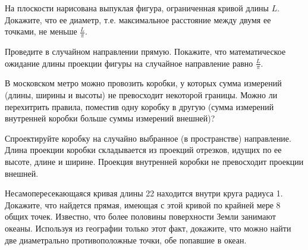 \begin{problem}
На плоскости нарисована выпуклая фигура, ограниченная кривой длины $L$. Докажите, что ее диаметр, т.е. максимальное расстояние между двумя ее точками, не меньше $\frac{L}{\pi }$.
\end{problem}
\begin{ordre}
Проведите в случайном направлении прямую. Покажите, что 
математическое ожидание длины проекции фигуры на случайное направление равно 
$\frac{L}{\pi }$.
\end{ordre}

\begin{problem}
В московском метро можно провозить коробки, у которых сумма измерений (длины, ширины и высоты) не превосходит некоторой границы. Можно ли перехитрить правила, поместив одну коробку в другую (сумма измерений внутренней коробки больше суммы измерений внешней)?
\end{problem}
\begin{ordre}
Спроектируйте коробку на случайно выбранное (в пространстве) 
направление. Длина проекции коробки складывается из проекций отрезков, 
идущих по ее высоте, длине и ширине. Проекция внутренней коробки не 
превосходит проекции внешней.
\end{ordre}

\begin{problem}
Несамопересекающаяся кривая длины 22 находится внутри круга радиуса 1. Докажите, что найдется прямая, имеющая с этой кривой по крайней мере 8 общих точек.
Известно, что более половины поверхности Земли занимают океаны. Используя из географии только этот факт, докажите, что можно найти две диаметрально противоположные точки, обе попавшие в океан.
\end{problem}

\begin{comment}

\begin{problem}
На плоскости расположено $2n$ векторов, выходящих из начала координат и длиной не более 1. Доказать, что существует угол $\alpha$ такой, что при повороте каждого из векторов на угол $\pm \alpha$, их векторная сумма окажется не большей 1.  
\end{problem}

\end{comment}